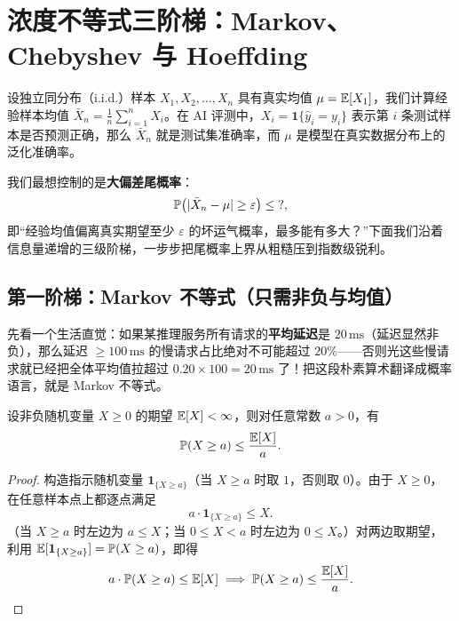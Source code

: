 \section{浓度不等式三阶梯：Markov、Chebyshev 与 Hoeffding}
\label{sec:ch3-concentration}

设独立同分布（i.i.d.）样本 $X_1, X_2, \dots, X_n$ 具有真实均值 $\mu = \mathbb{E}[X_1]$，我们计算经验样本均值 $\bar{X}_n = \frac{1}{n}\sum_{i=1}^n X_i$。在 AI 评测中，$X_i = \mathbf{1}\{\hat{y}_i = y_i\}$ 表示第 $i$ 条测试样本是否预测正确，那么 $\bar{X}_n$ 就是测试集准确率，而 $\mu$ 是模型在真实数据分布上的泛化准确率。

我们最想控制的是\textbf{大偏差尾概率}：
\[
  \mathbb{P}\bigl(|\bar{X}_n - \mu| \ge \varepsilon\bigr) \le \text{?},
\]
即“经验均值偏离真实期望至少 $\varepsilon$ 的坏运气概率，最多能有多大？”下面我们沿着信息量递增的三级阶梯，一步步把尾概率上界从粗糙压到指数级锐利。

\subsection{第一阶梯：Markov 不等式（只需非负与均值）}

先看一个生活直觉：如果某推理服务所有请求的\textbf{平均延迟}是 $20\,\text{ms}$（延迟显然非负），那么延迟 $\ge 100\,\text{ms}$ 的慢请求占比绝对不可能超过 $20\%$——否则光这些慢请求就已经把全体平均值拉超过 $0.20 \times 100 = 20\,\text{ms}$ 了！把这段朴素算术翻译成概率语言，就是 Markov 不等式。

\begin{thmBox}
\begin{theorem}
\label{thm:ch3-markov}
设非负随机变量 $X \ge 0$ 的期望 $\mathbb{E}[X] < \infty$，则对任意常数 $a > 0$，有
\begin{equation}
  \mathbb{P}(X \ge a) \le \frac{\mathbb{E}[X]}{a}. \label{eq:ch3-markov}
\end{equation}
\end{theorem}
\end{thmBox}

\begin{proof}
构造指示随机变量 $\mathbf{1}_{\{X \ge a\}}$（当 $X \ge a$ 时取 $1$，否则取 $0$）。由于 $X \ge 0$，在任意样本点上都逐点满足
\[
  a \cdot \mathbf{1}_{\{X \ge a\}} \le X.
\]
（当 $X \ge a$ 时左边为 $a \le X$；当 $0 \le X < a$ 时左边为 $0 \le X$。）对两边取期望，利用 $\mathbb{E}[\mathbf{1}_{\{X \ge a\}}] = \mathbb{P}(X \ge a)$，即得
\[
  a \cdot \mathbb{P}(X \ge a) \le \mathbb{E}[X] \implies \mathbb{P}(X \ge a) \le \frac{\mathbb{E}[X]}{a}.
\]
\end{proof}


